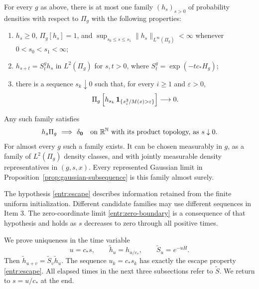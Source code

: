 \begin{theorem}\label{thm:entrance-selection}
For every \(g\) as above, there is at most one family
\((h_s)_{s>0}\) of probability densities with respect to \(\Pi_g\) with
the following properties:
\begin{enumerate}
 \item \(h_s\ge0\), \(\Pi_g[h_s]=1\), and
 \(\sup_{s_0\le s\le s_1}\|h_s\|_{L^\infty(\Pi_g)}<\infty\) whenever
 \(0<s_0<s_1<\infty\);
 \item \(h_{s+t}=S_t^g h_s\) in \(L^2(\Pi_g)\) for \(s,t>0\), where
 \(S_t^g=\exp(-t c_*H_g)\);
 \item there is a sequence \(s_k\downarrow0\) such that, for every
 \(i\ge1\) and \(\varepsilon>0\),
 \begin{equation}\label{entr:escape}
 \Pi_g\left[h_{s_k}\,
       \mathbf 1_{\{x_i^2/M(x)>\varepsilon\}}\right]\longrightarrow0.
 \end{equation}
\end{enumerate}
Any such family satisfies
\begin{equation}\label{entr:zero-boundary}
 h_s\Pi_g\ \Longrightarrow\ \delta_{\boldsymbol 0}
 \quad\text{on \(\mathbb R^{\mathbb N}\) with its product topology, as \(s\downarrow0\)}.
\end{equation}
For almost every \(g\) such a family exists.
It can be chosen measurably in \(g\), as a family of \(L^2(\Pi_g)\)
density classes, and with jointly measurable density representatives in
\((g,s,x)\).  Every represented Gaussian limit in
Proposition~\ref{prop:gaussian-subsequence} is this family almost surely.
\end{theorem}

The hypothesis \eqref{entr:escape} describes information retained from
the finite uniform initialization.  Different candidate families may
use different sequences in Item 3.  The zero-coordinate limit
\eqref{entr:zero-boundary} is a consequence of that hypothesis and
holds as \(s\) decreases to zero through all positive times.

We prove uniqueness in the time variable
\begin{equation}\label{entr:unit-time}
 u=c_*s,\qquad \widetilde h_u=h_{u/c_*},\qquad
 \widetilde S_u=e^{-uH}.
\end{equation}
Then \(\widetilde h_{u+v}=\widetilde S_v\widetilde h_u\).
The sequence \(u_k=c_*s_k\) has exactly the escape property
\eqref{entr:escape}.  All elapsed times in the next three subsections
refer to \(\widetilde S\).  We return to \(s=u/c_*\) at the end.

